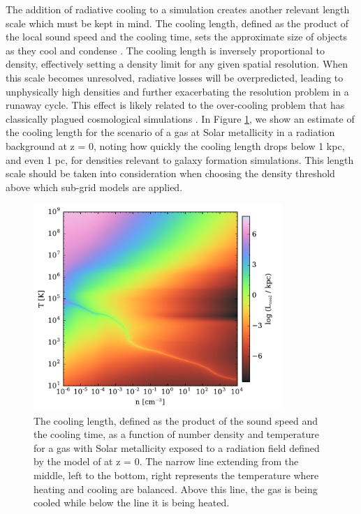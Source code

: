 The addition of radiative cooling to a simulation creates another
relevant length scale which must be kept in mind.  The cooling length,
defined as the product of the local sound speed and the cooling time,
sets the approximate size of objects as they cool and condense
\citep{2009A&A...508..725I}.  The cooling length is inversely
proportional to density, effectively setting a density limit for
any given spatial resolution.  When this scale becomes unresolved,
radiative losses will be overpredicted, leading to unphysically high
densities and further exacerbating the resolution problem in a runaway
cycle.  This effect is likely related to the over-cooling problem that
has classically plagued cosmological simulations
\citep[e.g.][]{1996ApJS..105...19K, 2001MNRAS.326.1228B}.
In Figure \ref{fig:cooling-length}, we show an estimate of the
cooling length for the scenario of a gas at Solar metallicity in a
\citet{2012ApJ...746..125H} radiation background at z = 0, noting how
quickly the cooling length drops below 1 kpc, and even 1 pc, for
densities relevant to galaxy formation simulations.  This
length scale should be taken into consideration when choosing the
density threshold above which sub-grid models are applied.

\begin{figure}
  \centering
  \includegraphics[width=0.84\textwidth]{cooling_length.pdf}
  \caption{
    The cooling length, defined as the product of the sound speed and
    the cooling time, as a function of number density and temperature
    for a gas with Solar metallicity exposed to a radiation field
    defined by the model of \citet{2012ApJ...746..125H} at z = 0.  The
    narrow line extending from the middle, left to the bottom, right
    represents the temperature where heating and cooling are
    balanced.  Above this line, the gas is being cooled while below
    the line it is being heated.
  } \label{fig:cooling-length}
\end{figure}

